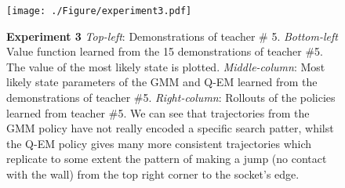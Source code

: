 \documentclass[final,3p,times,twocolumn]{elsarticle}
\begin{document}
\begin{figure}
 \centering
    \texttt{[image: ./Figure/experiment3.pdf]}
    \caption{\textbf{Experiment 3} \textit{Top-left}: Demonstrations of teacher \# 5. \textit{Bottom-left} Value function learned from the 15 demonstrations of teacher \#5. The value of the most 
    likely state is plotted. \textit{Middle-column}: Most likely state parameters of the GMM and Q-EM learned from the 
    demonstrations of teacher \#5. \textit{Right-column}: Rollouts of the policies learned from teacher \#5. We can see that trajectories 
    from the GMM policy have not really encoded a specific search patter, whilst the Q-EM policy gives many more consistent trajectories 
    which replicate to some extent the pattern of making a jump (no contact with the wall) from the top right corner to the socket's edge.}
    \label{fig:experiment3}
 \end{figure}
 
\end{document}
